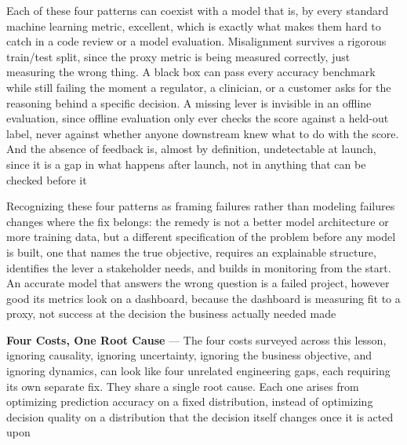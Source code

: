 Each of these four patterns can coexist with a model that is, by every standard machine
learning metric, excellent, which is exactly what makes them hard to catch in a code
review or a model evaluation. Misalignment survives a rigorous train/test split,
since the proxy metric is being measured correctly, just measuring the wrong
thing. A black box can pass every accuracy benchmark while still failing the moment
a regulator, a clinician, or a customer asks for the reasoning behind a specific
decision. A missing lever is invisible in an offline evaluation, since offline evaluation
only ever checks the score against a held-out label, never against whether
anyone downstream knew what to do with the score. And the absence of feedback is,
almost by definition, undetectable at launch, since it is a gap in what happens
after launch, not in anything that can be checked before it

Recognizing these four patterns as framing failures rather than modeling
failures changes where the fix belongs: the remedy is not a better model architecture
or more training data, but a different specification of the problem before any
model is built, one that names the true objective, requires an explainable
structure, identifies the lever a stakeholder needs, and builds in monitoring
from the start. An accurate model that answers the wrong question is a failed project,
however good its metrics look on a dashboard, because the dashboard is measuring
fit to a proxy, not success at the decision the business actually needed made

\textbf{Four Costs, One Root Cause} --- The four costs surveyed across this
lesson, ignoring causality, ignoring uncertainty, ignoring the business objective,
and ignoring dynamics, can look like four unrelated engineering gaps, each
requiring its own separate fix. They share a single root cause. Each one arises
from optimizing prediction accuracy on a fixed distribution, instead of optimizing
decision quality on a distribution that the decision itself changes once it is acted
upon

